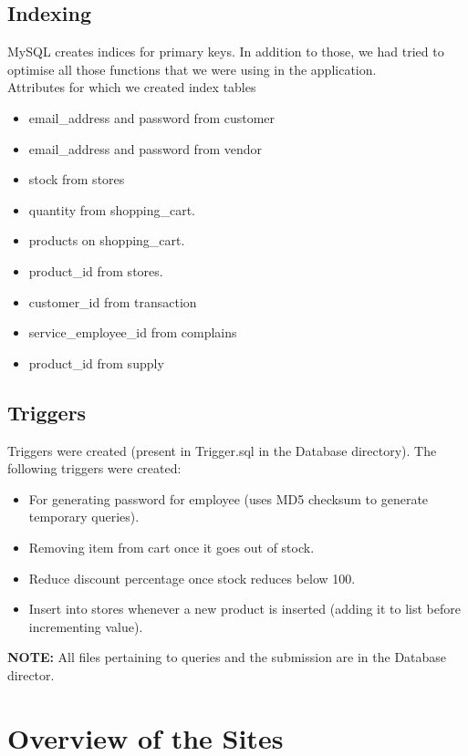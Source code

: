 \documentclass[12pt]{report}
\begin{document}
    \section{Indexing}
        MySQL creates indices for primary keys. In addition to those, we had tried to optimise all those functions that we were using in the application. \\
        Attributes for which we created index tables
        \begin{itemize}
            \item email\_address and password from customer
            \item email\_address and password from vendor
            \item stock from stores
            \item quantity from shopping\_cart.
            \item products on shopping\_cart.
            \item product\_id from stores.
            \item customer\_id from transaction
            \item service\_employee\_id from complains
            \item product\_id from supply
        \end{itemize}
    
    \section{Triggers}
        Triggers were created (present in Trigger.sql in the Database directory). The following triggers were created:
        \begin{itemize}
            \item For generating password for employee (uses MD5 checksum to generate temporary queries).
            \item Removing item from cart once it goes out of stock.
            \item Reduce discount percentage once stock reduces below 100.
            \item Insert into stores whenever a new product is inserted (adding it to list before incrementing value).
        \end{itemize}
    
    \textbf{NOTE:} All files pertaining to queries and the submission are in the Database director.

\chapter{Overview of the Sites}
\end{document}
